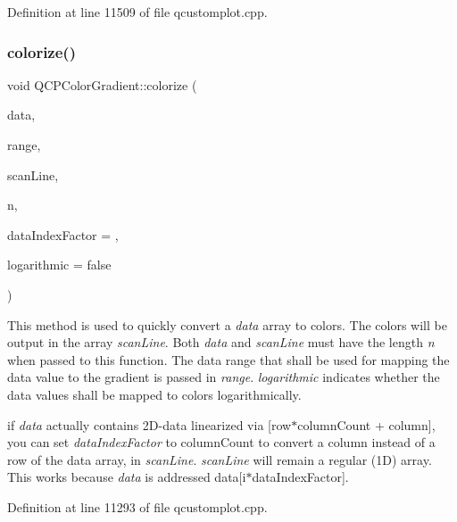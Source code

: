 Definition at line 11509 of file qcustomplot.\+cpp.

\mbox{\label{class_q_c_p_color_gradient_aaf423ceb943e177b0ed2c48c811d83dc}} 
\subsubsection{\texorpdfstring{colorize()}{colorize()}}
{\footnotesize\ttfamily void Q\+C\+P\+Color\+Gradient\+::colorize (\begin{DoxyParamCaption}\item[{const double $\ast$}]{data,  }\item[{const \hyperlink{class_q_c_p_range}{Q\+C\+P\+Range} \&}]{range,  }\item[{Q\+Rgb $\ast$}]{scan\+Line,  }\item[{int}]{n,  }\item[{int}]{data\+Index\+Factor = {},  }\item[{bool}]{logarithmic = {\ttfamily false} }\end{DoxyParamCaption})}

This method is used to quickly convert a {\itshape data} array to colors. The colors will be output in the array {\itshape scan\+Line}. Both {\itshape data} and {\itshape scan\+Line} must have the length {\itshape n} when passed to this function. The data range that shall be used for mapping the data value to the gradient is passed in {\itshape range}. {\itshape logarithmic} indicates whether the data values shall be mapped to colors logarithmically.

if {\itshape data} actually contains 2\+D-\/data linearized via {\ttfamily \mbox{[}row$\ast$column\+Count + column\mbox{]}}, you can set {\itshape data\+Index\+Factor} to {\ttfamily column\+Count} to convert a column instead of a row of the data array, in {\itshape scan\+Line}. {\itshape scan\+Line} will remain a regular (1D) array. This works because {\itshape data} is addressed {\ttfamily data\mbox{[}i$\ast$data\+Index\+Factor\mbox{]}}. 

Definition at line 11293 of file qcustomplot.\+cpp.

\mbox{\label{class_q_c_p_color_gradient_a9f72f501de429829ec446333316decda}} 
